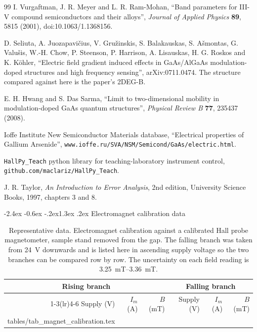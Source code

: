 \documentclass[11pt,a4paper]{article}
\makeatletter
\newcommand{\datarows}[1]{\@@input #1 }
\renewcommand\section{\@startsection{section}{1}{\z@}%
  {-2.4ex \@plus -0.6ex \@minus -.2ex}{1.3ex \@plus .2ex}%
  {\normalfont\large\bfseries}}
\makeatother
\begin{document}
\begin{thebibliography}{99}
 I. Vurgaftman, J. R. Meyer and L. R. Ram-Mohan, ``Band parameters for
III-V compound semiconductors and their alloys'', \textit{Journal of Applied Physics}
\textbf{89}, 5815 (2001), doi:10.1063/1.1368156.

 D. Seliuta, A. Juozapavi\v{c}ius, V. Gru\v{z}inskis, S. Balakauskas,
S. A\v{s}montas, G. Valu\v{s}is, W.-H. Chow, P. Steenson, P. Harrison, A. Lisauskas,
H. G. Roskos and K. K\"ohler, ``Electric field gradient induced effects in GaAs/AlGaAs
modulation-doped structures and high frequency sensing'', arXiv:0711.0474. The structure
compared against here is the paper's 2DEG-B.

 E. H. Hwang and S. Das Sarma, ``Limit to two-dimensional mobility in
modulation-doped GaAs quantum structures'', \textit{Physical Review B} \textbf{77}, 235437
(2008).

 Ioffe Institute New Semiconductor Materials database, ``Electrical properties
of Gallium Arsenide'', \texttt{www.ioffe.ru/SVA/NSM/Semicond/GaAs/electric.html}.

 \texttt{HallPy\_Teach} python library for teaching-laboratory instrument
control, \texttt{github.com/\allowbreak maclariz/\allowbreak HallPy\_Teach}.

 J. R. Taylor, \textit{An Introduction to Error Analysis}, 2nd edition,
University Science Books, 1997, chapters 3 and 8.

\end{thebibliography}

\appendix

\section{Electromagnet calibration data}
\label{app:magnet}

\begin{table}[H]
\centering
\caption{Representative data. Electromagnet calibration against a calibrated Hall probe
magnetometer, sample stand removed from the gap. The falling branch was taken from
\qty{24}{\volt} downwards and is listed here in ascending supply voltage so the two branches
can be compared row by row. The uncertainty on each field reading is
\qtyrange{3.25}{3.36}{\milli\tesla}.}
\label{tab:appmagnet}
\scriptsize
\begin{tabular}{rrrrrr}
\toprule
\multicolumn{3}{c}{Rising branch} & \multicolumn{3}{c}{Falling branch} \\
\cmidrule(lr){1-3}\cmidrule(lr){4-6}
Supply (\unit{\volt}) & $I_m$ (\unit{\ampere}) & $B$ (\unit{\milli\tesla}) &
Supply (\unit{\volt}) & $I_m$ (\unit{\ampere}) & $B$ (\unit{\milli\tesla}) \\
\midrule
\datarows{tables/tab_magnet_calibration.tex}
\bottomrule
\end{tabular}
\end{table}
\end{document}
